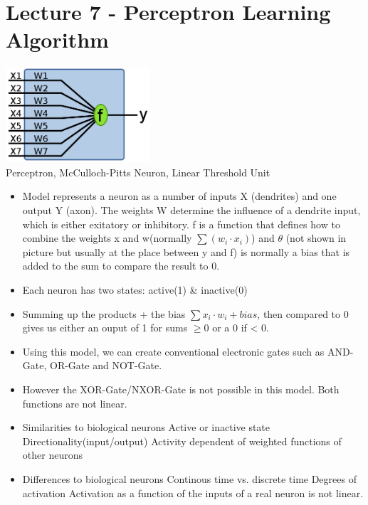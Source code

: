 \documentclass[english,11pt]{article}
\begin{document}
\section{Lecture 7 - Perceptron Learning Algorithm}
\includegraphics[width=0.4\textwidth]{perceptron.png}\\
Perceptron, McCulloch-Pitts Neuron, Linear Threshold Unit\\
\begin{itemize}
\item Model represents a neuron as a number of inputs X (dendrites) and one output Y (axon). The weights W determine the influence of a dendrite input, which is either exitatory or inhibitory. f is a function that defines how to combine the weights x and w(normally $\sum (w_i \cdot x_i)$) and $\theta$ (not shown in picture but usually at the place between y and f) is normally a bias that is added to the sum to compare the result to 0.
\item Each neuron has two states: active(1) \& inactive(0)
\item Summing up the products + the bias $\sum x_i\cdot w_i + bias$, then compared to 0 gives us either an ouput of 1 for sums $\ge 0$ or a 0 if < 0.
\item Using this model, we can create conventional electronic gates such as AND-Gate, OR-Gate and NOT-Gate. 
\item However the XOR-Gate/NXOR-Gate is not possible in this model. Both functions are not linear.
\item Similarities to biological neurons
\subitem Active or inactive state
\subitem Directionality(input/output)
\subitem Activity dependent of weighted functions of other neurons
\item Differences to biological neurons
\subitem Continous time vs. discrete time
\subitem Degrees of activation
\subitem Activation as a function of the inputs of a real neuron is not linear.
\end{itemize}
\end{document}
